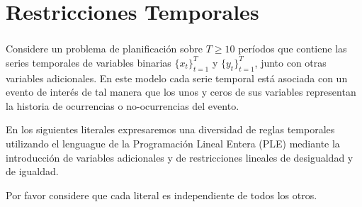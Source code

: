 \documentclass[ 10pt, xcolor = dvipsnames]{beamer}
\begin{document}
\section{Restricciones Temporales}

\begin{frame}[allowframebreaks]
\frametitle{\insertsection}

Considere un problema de planificaci\'on sobre $T \geq 10$ per\'iodos que contiene las series temporales de variables binarias $\{ x_t \}_{t=1}^T$ y $\{ y_t \}_{t=1}^T$, junto con otras variables adicionales. En este modelo cada serie temporal est\'a asociada con un evento de inter\'es de tal manera que los unos y ceros de sus variables representan la historia de ocurrencias o no-ocurrencias del evento. 

En los siguientes literales expresaremos una diversidad de reglas temporales utilizando el lenguague de la Programaci\'on Lineal Entera (PLE) mediante la introducci\'on de variables adicionales y de restricciones lineales de desigualdad y de igualdad. 

Por favor considere que cada literal es independiente de todos los otros. 

\end{frame}
\end{document}
